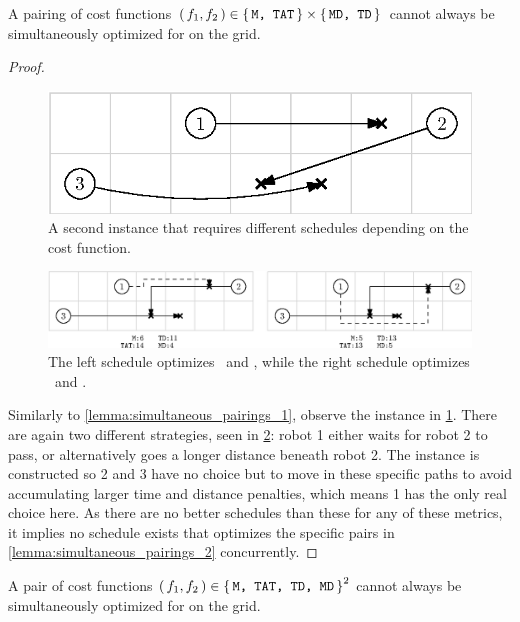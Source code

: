 \begin{lemma}\label{lemma:simultaneous_pairings_2}
	A pairing of cost functions \((\, f_1, f_2 \,) \in \set{\texttt{M, TAT}} \times \set{\texttt{MD, TD}}\) cannot always be simultaneously optimized for on the grid.
\end{lemma}

\begin{proof}
	\begin{figure}[h]
		\centering
		\includegraphics[width=0.45\linewidth]{ipe/sim2_problem.eps}
		\caption{
			A second instance that requires different schedules depending on the cost function.
		}
		\label{fig:simultaneous_problem_2}
	\end{figure}

	\begin{figure}[h]
		\centering
		\includegraphics[width=\linewidth]{ipe/sim2_strat.eps}
		\caption{
			The left schedule optimizes \ and , while the right schedule optimizes \ and .
		}
		\label{fig:simultaneous_strategies_2}
	\end{figure}

	Similarly to \cref{lemma:simultaneous_pairings_1}, observe the instance in \cref{fig:simultaneous_problem_2}. 
	There are again two different strategies, seen in \cref{fig:simultaneous_strategies_2}: robot 1 either waits for robot 2 to pass, or alternatively goes a longer distance beneath robot 2.
	The instance is constructed so 2 and 3 have no choice but to move in these specific paths to avoid accumulating larger time and distance penalties, which means 1 has the only real choice here.
	As there are no better schedules than these for any of these metrics, it implies no schedule exists that optimizes the specific pairs in \cref{lemma:simultaneous_pairings_2} concurrently.
\end{proof}

\begin{theorem}
	A pair of cost functions \((\, f_1, f_2 \,) \in \set{\texttt{M, TAT, TD, MD}}^2 \) cannot always be simultaneously optimized for on the grid.
\end{theorem}

